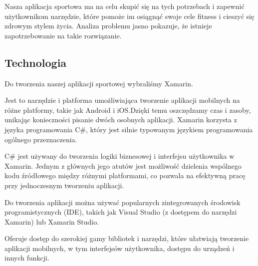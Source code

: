 Nasza aplikacja sportowa ma na celu skupić się na tych potrzebach i zapewnić użytkownikom narzędzie, które pomoże im osiągnąć swoje cele fitness i cieszyć się zdrowym stylem życia. Analiza problemu jasno pokazuje, że istnieje zapotrzebowanie na takie rozwiązanie.

\subsection{Technologia}  %

Do tworzenia naszej aplikacji sportowej wybraliśmy Xamarin.

Jest to narzędzie i platforma umożliwiająca tworzenie aplikacji mobilnych na różne platformy, takie jak Android i iOS.Dzięki temu oszczędzamy czas i zasoby, unikając konieczności pisanie dwóch osobnych aplikacji. Xamarin korzysta z języka programowania C\#, który jest silnie typowanym językiem programowania ogólnego przeznaczenia.

C\# jest używany do tworzenia logiki biznesowej i interfejsu użytkownika w Xamarin.
Jednym z głównych jego atutów jest możliwość dzielenia wspólnego kodu źródłowego między różnymi platformami, co pozwala na efektywną pracę przy jednoczesnym tworzeniu aplikacji.

Do tworzenia aplikacji można używać popularnych zintegrowanych środowisk programistycznych (IDE), takich jak Visual Studio (z dostępem do narzędzi Xamarin) lub Xamarin Studio.

Oferuje dostęp do szerokiej gamy bibliotek i narzędzi, które ułatwiają tworzenie aplikacji mobilnych, w tym interfejsów użytkownika, dostępu do urządzeń i innych funkcji.

